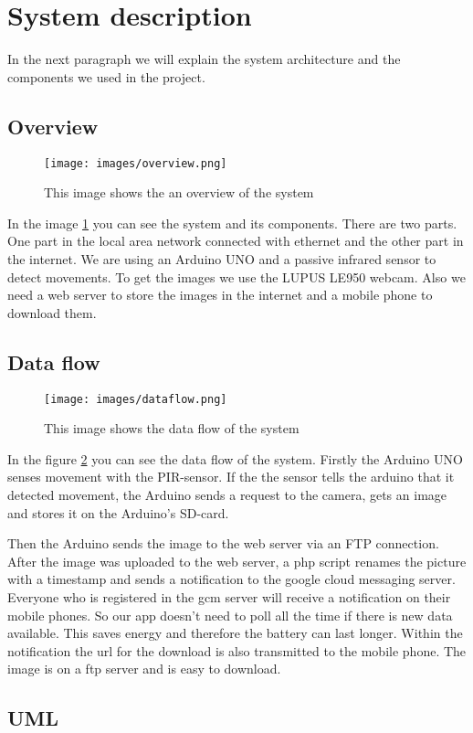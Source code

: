 \section[System description - Team]{System description}
In the next paragraph we will explain the system architecture and the components we used in the project.

\subsection{Overview}
\begin{figure}[H]
	\centering
	\texttt{[image: images/overview.png]}
	\caption[System overview]{This image shows the an overview of the system}
	\label{overview}
\end{figure}

In the image \ref{overview} you can see the system and its components. 
There are two parts. One part in the local area network connected with ethernet and the other part in the internet. We are using an Arduino UNO and a passive infrared sensor to detect movements. To get the images we use the LUPUS LE950 webcam. Also we need a web server to store the images in the internet and a mobile phone to download them.

\subsection{Data flow}
\begin{figure}[H]
	\centering
	\texttt{[image: images/dataflow.png]}
	\caption[System data flow]{This image shows the data flow of the system}
	\label{dataflow}
\end{figure}

In the figure \ref{dataflow} you can see the data flow of the system.
Firstly the Arduino UNO senses movement with the PIR-sensor. If the the sensor tells the arduino that it detected movement, the Arduino sends a request to the camera, gets an image and stores it on the Arduino’s SD-card.

Then the Arduino sends the image to the web server via an FTP connection. After the image was uploaded to the web server, a php script renames the picture with a timestamp and sends a notification to the google cloud messaging server. Everyone who is registered in the gcm server will receive a notification on their mobile phones. So our app doesn’t need to poll all the time if there is new data available. This saves energy and therefore the battery can last longer. Within the notification the url for the download is also transmitted to the mobile phone. The image is on a ftp server and is easy to download.

\subsection{UML}
